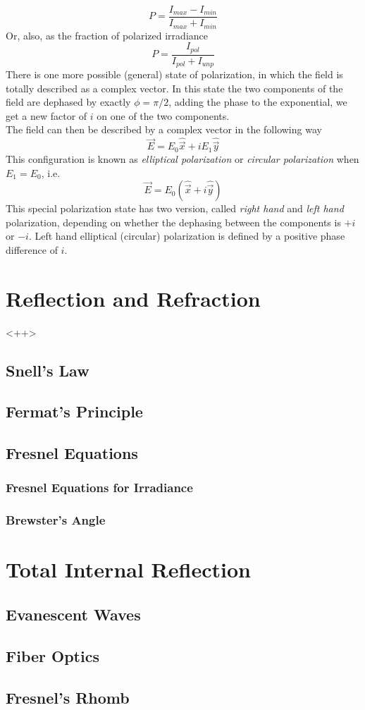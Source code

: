 \documentclass[../electromagnetism.tex]{subfiles}
\begin{document}
\begin{equation}
	P=\frac{I_{max}-I_{min}}{I_{max}+I_{min}}
	\label{eq:degpol.pol}
\end{equation}
Or, also, as the fraction of polarized irradiance
\begin{equation}
	P=\frac{I_{pol}}{I_{pol}+I_{unp}}
	\label{eq:degpol2.pol}
\end{equation}
There is one more possible (general) state of polarization, in which the field is totally described as a complex vector. In this state the two components of the field are dephased by exactly $\phi=\pi/2$, adding the phase to the exponential, we get a new factor of $i$ on one of the two components.\\
The field can then be described by a complex vector in the following way
\begin{equation}
	\vec{E}=E_0\hat{\vec{x}}+iE_1\hat{\vec{y}}
	\label{eq:elliptical.pol}
\end{equation}
This configuration is known as \textit{elliptical polarization} or \textit{circular polarization} when $E_1=E_0$, i.e.
\begin{equation}
	\vec{E}=E_0(\hat{\vec{x}}+i\hat{\vec{y}})
	\label{eq:circular.pol}
\end{equation}
This special polarization state has two version, called \textit{right hand} and \textit{left hand} polarization, depending on whether the dephasing between the components is $+i$ or $-i$. Left hand elliptical (circular) polarization is defined by a positive phase difference of $i$.
\section{Reflection and Refraction}
<++>
\subsection{Snell's Law}
\subsection{Fermat's Principle}
\subsection{Fresnel Equations}
\subsubsection{Fresnel Equations for Irradiance}
\subsubsection{Brewster's Angle}
\section{Total Internal Reflection}
\subsection{Evanescent Waves}
\subsection{Fiber Optics}
\subsection{Fresnel's Rhomb}
\end{document}
